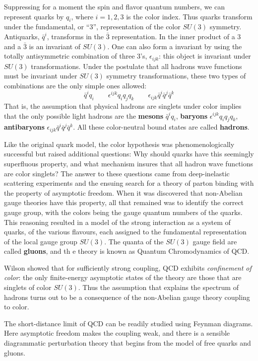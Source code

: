 \documentclass[TheoreticalPhy_ModB.tex]{subfiles}
\begin{document}
Suppressing for a moment the spin and flavor quantum numbers, we can represent quarks by $q_i$, where $i=1,2,3$ is the color index. Thus quarks transform under the fundamental, or ``3'',  representation of the color $SU(3)$ symmetry. Antiquarks, $\bar q^i$, transforms in the $\bar 3$ representation. In the inner product of a $3$ and a $\bar 3$ is an invariant of $SU(3)$. One can also form a invariant by using the totally antisymmetric combination of three 3's, $\epsilon_{ijk}$: this object is invariant under $SU(3)$ transformations. Under the postulate that all hadrons wave functions must be invariant under $SU(3)$ symmetry transformations, these two types of combinations are the only simple ones allowed:
\[\bar q^iq_i\qquad\epsilon^{ijk}q_iq_jq_k\qquad\epsilon_{ijk}\bar q^i\bar q^j\bar q^k\]
That is, the assumption that physical hadrons are singlets under color implies that the only possible light hadrons are the \textbf{mesons} $\bar q^iq_i$, \textbf{baryons} $\epsilon^{ijk}q_iq_jq_k$, \textbf{antibaryons} $\epsilon_{ijk}\bar q^i\bar q^j\bar q^k$. All these color-neutral bound states are called \textbf{hadrons}. 

Like the original quark model, the color hypothesis was phenomenologically successful but raised additional questions: Why should quarks have this seemingly superfluous property, and what mechanism insures that all hadron wave functions are color singlets? The answer to these questions came from deep-inelastic scattering experiments and the ensuing search for a theory of parton binding with the property of asymptotic freedom. When it was discovered that non-Abelian gauge theories have this property, all that remained was to identify the correct gauge group, with the colors being the gauge quantum numbers of the quarks. This reasoning resulted in a model of the strong interaction as a system of quarks, of the various flavours, each assigned to the fundamental representation of the local gauge group $SU(3)$. The quanta of the $SU(3)$ gauge field are called \textbf{gluons}, and th e theory is known as Quantum Chromodynamics of QCD. 

Wilson showed that for sufficiently strong coupling, QCD exhibits \emph{confinement of color}: the only finite-energy asymptotic states of the theory are those that are singlets of color $SU(3)$. Thus the assumption that explains the spectrum of hadrons turns out to be a consequence of the non-Abelian gauge theory coupling to color. 

The short-distance limit of QCD can be readily studied using Feynman diagrams. Here asymptotic freedom makes the coupling weak, and there is a sensible diagrammatic perturbation theory that begins from the model of free quarks and gluons.
\end{document}
